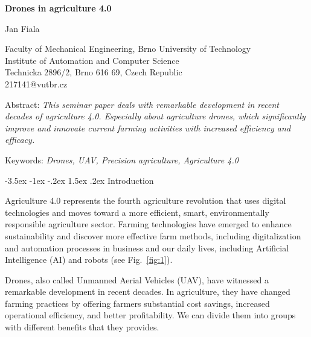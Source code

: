 \documentclass[a4paper,10pt]{article}
\makeatletter
\theoremstyle{definition}
\renewcommand\section{\@startsection {section}{1}{\z@}%
                                   {-3.5ex \@plus -1ex \@minus -.2ex}%
                                   {1.5ex \@plus.2ex}%
                                   {\large\bfseries}}
\makeatother
\begin{document}
\pagestyle{empty}

\begin{center}
{\bf \Large Drones in agriculture 4.0}
\end{center}

\smallskip
\begin{center}
{\large Jan Fiala}
\end{center}

\smallskip
\begin{center}
Faculty of Mechanical Engineering, Brno University of Technology\\
Institute of Automation and Computer Science\\
Technicka 2896/2, Brno 616 69, Czech Republic\\
217141@vutbr.cz\\
\end{center}

\bigskip
\noindent Abstract: \textit{This seminar paper deals with remarkable development in recent decades of agriculture 4.0. Especially about agriculture drones, which significantly improve and innovate current farming activities with increased efficiency and efficacy. }


\vspace*{10pt} \noindent Keywords: \textit{Drones, UAV, Precision agriculture, Agriculture 4.0}

\bigskip
\section{Introduction}
\label{sec:1}

Agriculture 4.0 represents the fourth agriculture revolution that uses digital technologies and moves toward a more efficient, smart, environmentally responsible agriculture sector. Farming technologies have emerged to enhance sustainability and discover more effective farm methods, including digitalization and automation processes in business and our daily lives, including Artificial Intelligence (AI) and robots (see Fig.~\ref{fig:1}). 

Drones, also called Unmanned Aerial Vehicles (UAV), have witnessed a remarkable development in recent decades. In agriculture, they have changed farming practices by offering farmers substantial cost savings, increased operational efficiency, and better profitability. We can divide them into groups with different benefits that they provides.\cite{JAVAID2022150,REJEB2022107017}
\end{document}
